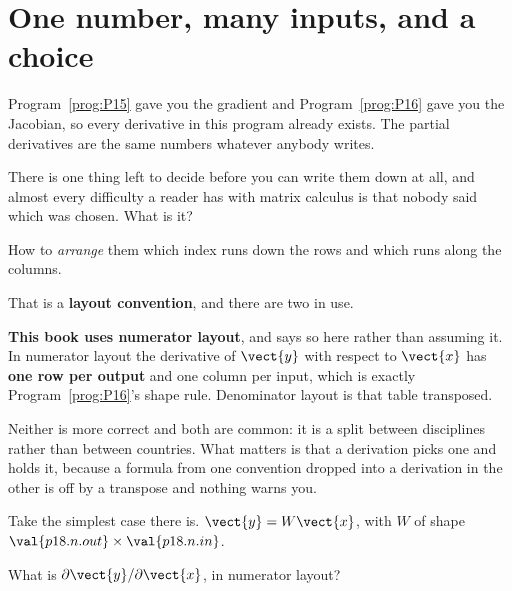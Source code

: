 \section{One number, many inputs, and a choice}
\label{sec:P18-layout}

\begin{fr}
Program~\ref{prog:P15} gave you the gradient and Program~\ref{prog:P16} gave
you the Jacobian, so every derivative in this program already exists. The
partial derivatives are the same numbers whatever anybody writes.

There is one thing left to decide before you can write them down at all, and
almost every difficulty a reader has with matrix calculus is that nobody said
which was chosen. What is it?
\dotline
\nextframe
\end{fr}

\begin{fr}
\begin{ansblock}
How to \emph{arrange} them \dash{} which index runs down the rows and which
runs along the columns.
\end{ansblock}

That is a \textbf{layout convention}, and there are two in use.

\begin{notationbox}
\textbf{This book uses numerator layout}, and says so here rather than
assuming it. In numerator layout the derivative of $\vect{y}$ with respect to
$\vect{x}$ has \textbf{one row per output} and one column per input, which is
exactly Program~\ref{prog:P16}'s shape rule. Denominator layout is that table
transposed.

Neither is more correct and both are common: it is a split between
disciplines rather than between countries. What matters is that a derivation
picks one and holds it, because a formula from one convention dropped into a
derivation in the other is off by a transpose and nothing warns you.
\end{notationbox}

\end{fr}

\begin{fr}
Take the simplest case there is. $\vect{y} = W\vect{x}$, with $W$ of shape
$\val{p18.n.out} \times \val{p18.n.in}$.

What is $\partial \vect{y} / \partial \vect{x}$, in numerator layout?
\nextframe
\end{fr}

